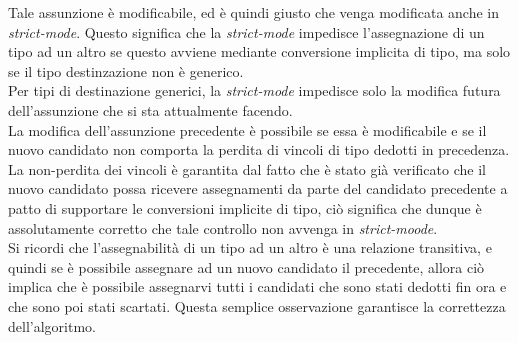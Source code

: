 Tale assunzione è modificabile, ed è quindi giusto che venga modificata anche in \textit{strict-mode}. Questo 
significa che la \textit{strict-mode} impedisce l'assegnazione di un tipo ad un altro se questo avviene mediante 
conversione implicita di tipo, ma solo se il tipo destinzazione non è generico. \\

Per tipi di destinazione generici, la \textit{strict-mode} impedisce solo la modifica futura dell'assunzione 
che si sta attualmente facendo. \\

La modifica dell'assunzione precedente è possibile se essa è modificabile e se il nuovo candidato 
non comporta la perdita di vincoli di tipo dedotti in precedenza. La non-perdita dei vincoli è garantita
dal fatto che è stato già verificato che il nuovo candidato possa ricevere assegnamenti da parte del candidato 
precedente a patto di supportare le conversioni implicite di tipo, ciò significa che dunque è assolutamente corretto 
che tale controllo non avvenga in \textit{strict-moode}. \\

Si ricordi che l'assegnabilità di un tipo ad un altro è una relazione transitiva, e quindi se è possibile assegnare 
ad un nuovo candidato il precedente, allora ciò implica che è possibile assegnarvi tutti i candidati che sono 
stati dedotti fin ora e che sono poi stati scartati. Questa semplice osservazione garantisce la correttezza 
dell'algoritmo. \\